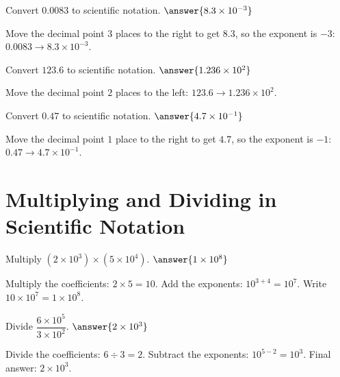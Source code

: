 \documentclass{ximera}
\begin{document}
\begin{problem}
Convert $0.0083$ to scientific notation. $\answer{8.3 \times 10^{-3}}$
\begin{feedback}
Move the decimal point $3$ places to the right to get $8.3$, so the exponent is $-3$: $0.0083 \rightarrow 8.3 \times 10^{-3}$.
\end{feedback}
\end{problem}

\begin{problem}
Convert $123.6$ to scientific notation. $\answer{1.236 \times 10^2}$
\begin{feedback}
Move the decimal point $2$ places to the left: $123.6 \rightarrow 1.236 \times 10^2$.
\end{feedback}
\end{problem}

\begin{problem}
Convert $0.47$ to scientific notation. $\answer{4.7 \times 10^{-1}}$
\begin{feedback}
Move the decimal point $1$ place to the right to get $4.7$, so the exponent is $-1$: $0.47 \rightarrow 4.7 \times 10^{-1}$.
\end{feedback}
\end{problem}



\section*{Multiplying and Dividing in Scientific Notation}

\begin{problem}
Multiply $(2 \times 10^3) \times (5 \times 10^4)$. $\answer{1 \times 10^8}$
\begin{feedback}
Multiply the coefficients: $2 \times 5 = 10$. Add the exponents: $10^{3+4} = 10^7$. Write $10 \times 10^7 = 1 \times 10^8$.
\end{feedback}
\end{problem}

\begin{problem}
Divide $\dfrac{6 \times 10^5}{3 \times 10^2}$. $\answer{2 \times 10^3}$
\begin{feedback}
Divide the coefficients: $6 \div 3 = 2$. Subtract the exponents: $10^{5-2} = 10^3$. Final answer: $2 \times 10^3$.
\end{feedback}
\end{problem}
\end{document}
